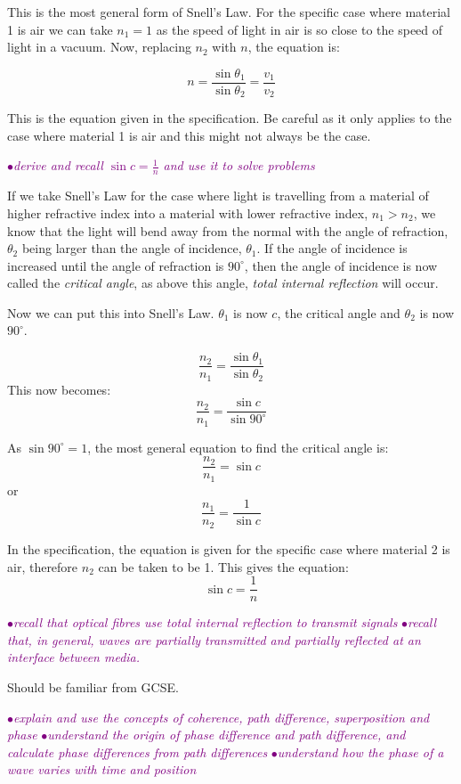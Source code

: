 \documentclass[a4paper,11pt,twoside]{memoir}
\newcounter{spec}[chapter]
\newcommand{\spec}[1]{\Needspace{5\baselineskip}\textcolor{purple}{$\bullet$\hspace{0.5cm}\textit{#1}}}
\begin{document}
This is the most general form of Snell's Law. For the specific case where material 1 is air we can take $n_1 = 1$ as the speed of light in air is so close to the speed of light in a vacuum. Now, replacing $n_2$ with $n$, the equation is:

\[ n = \frac{\sin{\theta_1}}{\sin{\theta_2}} = \frac{v_1}{v_2}\]

This is the equation given in the specification. Be careful as it only applies to the case where material 1 is air and this might not always be the case.

\spec{derive and recall $\sin{c} = \frac{1}{n}$ and use it to solve problems}

If we take Snell's Law for the case where light is travelling from a material of higher refractive index into a material with lower refractive index, $n_1 > n_2$, we know that the light will bend away from the normal with the angle of refraction, $\theta_2$ being larger than the angle of incidence, $\theta_1$. If the angle of incidence is increased until the angle of refraction is $90^{\circ}$, then the angle of incidence is now called the \emph{critical angle}, as above this angle, \emph{total internal reflection} will occur.

Now we can put this into Snell's Law. $\theta_1$ is now $c$, the critical angle and $\theta_2$ is now $90^{\circ}$.

$$\frac{n_2}{n_1} = \frac{\sin{\theta_1}}{\sin{\theta_2}}$$
This now becomes:
$$\frac{n_2}{n_1} = \frac{\sin{c}}{\sin{90^{\circ}}}$$

As $\sin{90^{\circ}} = 1$, the most general equation to find the critical angle is:
$$\frac{n_2}{n_1} = \sin{c}$$
or
$$\frac{n_1}{n_2} = \frac{1}{\sin{c}}$$

In the specification, the equation is given for the specific case where material 2 is air, therefore $n_2$ can be taken to be 1. This gives the equation:
$$\sin{c} = \frac{1}{n}$$

\spec{recall that optical fibres use total internal reflection to transmit signals}
\spec{recall that, in general, waves are partially transmitted and partially reflected at an interface between media.}

Should be familiar from GCSE.

\spec{explain and use the concepts of coherence, path difference, superposition and phase}
\spec{understand the origin of phase difference and path difference, and calculate phase differences from path differences}
\spec{understand how the phase of a wave varies with time and position}
\end{document}
